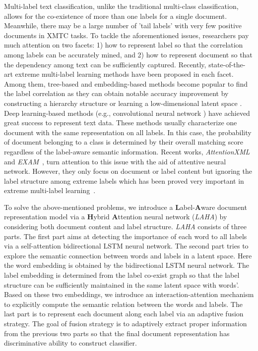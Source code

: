 \documentclass[runningheads]{llncs}
\begin{document}
Multi-label text classification, unlike the traditional multi-class classification, allows for the co-existence of more than one labels for a single document. Meanwhile, there may be a large number of 'tail labels' with very few positive documents in XMTC tasks. To tackle the aforementioned issues, researchers pay much attention on two facets: 1) how to represent label so that the correlation among labels can be accurately mined, and 2) how to represent document so that the dependency among text can be sufficiently captured. Recently, state-of-the-art extreme multi-label learning methods have been proposed in each facet. 
Among them, tree-based and embedding-based methods become popular to find the label correlation as they can obtain notable accuracy improvement by constructing a hierarchy structure \cite{ref_article18} or learning a low-dimensional latent space \cite{ref_article9}.
Deep learning-based methods (e.g., convolutional neural network \cite{ref_article6}) have achieved great success to represent text data. These methods usually characterize one document with the same representation on all labels. In this case, the probability of document belonging to a class is determined by their overall matching score regardless of the label-aware semantic information. Recent works, \textit{AttentionXML}~\cite{ref_article7} and \textit{EXAM}~\cite{ref_article8}, turn attention to this issue with the aid of attentive neural network. However, they only focus on document or label content but ignoring the label structure among extreme labels which has been proved very important in extreme multi-label learning~\cite{ref_article9}.






To solve the above-mentioned problems, we introduce a \textbf{L}abel-\textbf{A}ware document representation model via a \textbf{H}ybrid \textbf{A}ttention neural network (\textit{LAHA}) by considering both document content and label structure. \textit{LAHA} consists of three parts. The first part aims at detecting the importance of each word to all labels via a self-attention bidirectional LSTM neural network. The second part tries to explore the semantic connection between words and labels in a latent space. Here the word embedding is obtained by the bidirectional LSTM neural network. The label embedding is determined from the label co-exist graph so that the label structure can be sufficiently maintained in the same latent space with words'. Based on these two embeddings, we introduce an interaction-attention mechanism to explicitly compute the semantic relation between the words and labels. The last part is to represent each document along each label via an adaptive fusion strategy. The goal of fusion strategy is to adaptively extract proper information from the previous two parts so that the final document representation has discriminative ability to construct classifier. 
\end{document}
